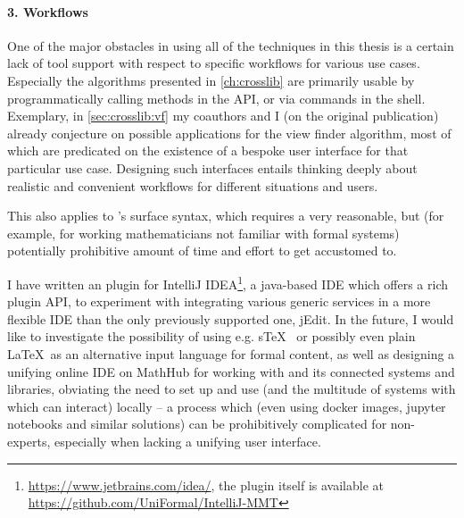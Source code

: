 \paragraph{3. Workflows} One of the major obstacles in using all of the techniques in this thesis is a certain lack of tool support with respect to specific workflows for various use cases. Especially the algorithms presented in \autoref{ch:crosslib} are primarily usable by programmatically calling methods in the \mmt API, or via commands in the \mmt shell. Exemplary, in \autoref{sec:crosslib:vf} my coauthors and I (on the original publication) already conjecture on possible applications for the view finder algorithm, most of which are predicated on the existence of a bespoke user interface for that particular use case.
Designing such interfaces entails thinking deeply about realistic and convenient workflows for different situations and users. 

This also applies to \mmt's surface syntax, which requires a very reasonable, but (for example, for working mathematicians not familiar with formal systems) potentially prohibitive amount of time and effort to get accustomed to.

I have written an \mmt plugin for IntelliJ IDEA\footnote{\url{https://www.jetbrains.com/idea/}, the plugin itself is available at \url{https://github.com/UniFormal/IntelliJ-MMT}}, a java-based IDE which offers a rich plugin API, to experiment with integrating various generic services in a more flexible IDE than the only previously supported one, jEdit. In the future, I would like to investigate the possibility of using e.g. s\TeX~\cite{stex} or possibly even plain \LaTeX\ as an alternative input language for formal \mmt content, as well as designing a unifying online IDE on MathHub for working with \mmt and its connected systems and libraries, obviating the need to set up and use \mmt (and the multitude of systems with which \mmt can interact) locally -- a process which (even using docker images, jupyter notebooks and similar solutions) can be prohibitively complicated for non-experts, especially when lacking a unifying user interface.